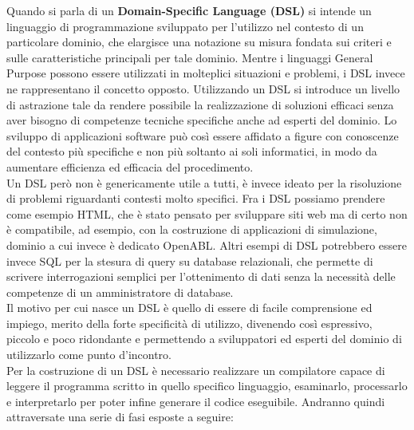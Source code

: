 Quando si parla di un \textbf{Domain-Specific Language (DSL)} si intende un linguaggio di programmazione sviluppato per l'utilizzo nel contesto di un particolare dominio, che elargisce una notazione su misura fondata sui criteri e sulle caratteristiche principali per tale dominio.
Mentre i linguaggi General Purpose possono essere utilizzati in molteplici situazioni e problemi, i DSL invece ne rappresentano il concetto opposto. Utilizzando un DSL si introduce un livello di astrazione tale da rendere possibile la realizzazione di soluzioni efficaci senza aver bisogno di competenze tecniche  specifiche anche ad esperti del dominio. Lo sviluppo di applicazioni software può così essere affidato a figure con conoscenze del contesto più specifiche e non più soltanto ai soli informatici, in modo da aumentare efficienza ed efficacia del procedimento.\\
Un DSL però non è genericamente utile a tutti, è invece ideato per la risoluzione di problemi riguardanti contesti molto specifici.
Fra i DSL possiamo prendere come esempio HTML, che è stato pensato per sviluppare siti web ma di certo non è compatibile, ad esempio, con la costruzione di applicazioni di simulazione, dominio a cui invece è dedicato OpenABL. Altri esempi di DSL potrebbero essere invece SQL per la stesura di query su database relazionali, che permette di scrivere interrogazioni semplici per l'ottenimento di dati senza la necessità delle competenze di un amministratore di database. \\
Il motivo per cui nasce un DSL è quello di essere di facile comprensione ed impiego, merito della forte specificità di utilizzo, divenendo così espressivo, piccolo e poco ridondante e permettendo a sviluppatori ed esperti del dominio di utilizzarlo come punto d'incontro. \\
Per la costruzione di un DSL è necessario realizzare un compilatore capace di leggere il programma scritto in quello specifico linguaggio, esaminarlo, processarlo e interpretarlo per poter infine generare il codice eseguibile. Andranno quindi attraversate una serie di fasi esposte a seguire:

